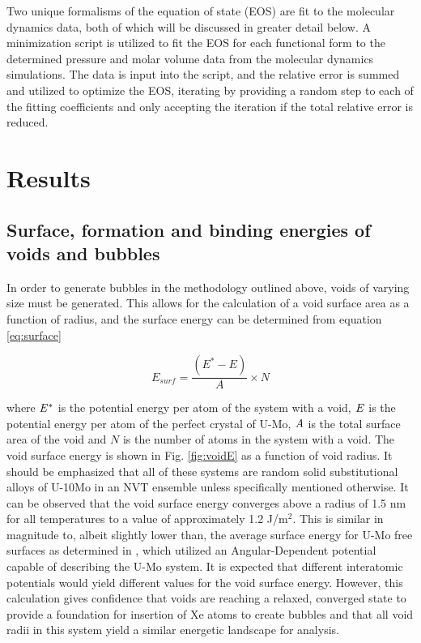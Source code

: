 \documentclass[review]{elsarticle}
\begin{document}
Two unique formalisms of the equation of state (EOS) are fit to the molecular dynamics data, both of which will be discussed in greater detail below. A minimization script is utilized to fit the EOS for each functional form to the determined pressure and molar volume data from the molecular dynamics simulations. The data is input into the script, and the relative error is summed and utilized to optimize the EOS, iterating by providing a random step to each of the fitting coefficients and only accepting the iteration if the total relative error is reduced. 

\section{Results}

\subsection{Surface, formation and binding energies of voids and bubbles}

In order to generate bubbles in the methodology outlined above, voids of varying size must be generated. This allows for the calculation of a void surface area as a function of radius, and the surface energy can be determined from equation \ref{eq:surface}

\begin{equation}
\label{eq:surface}
E_{surf}= \frac{(E^{*} - E)}{A} \times N
\end{equation}

where $\it{E^{*}}$ is the potential energy per atom of the system with a void, $\it{E}$ is the potential energy per atom of the perfect crystal of U-Mo, $\it{A}$ is the total surface area of the void and $\textit{N}$ is the number of atoms in the system with a void. The void surface energy is shown in Fig. \ref{fig:voidE} as a function of void radius. It should be emphasized that all of these systems are random solid substitutional alloys of U-10Mo in an NVT ensemble unless specifically mentioned otherwise. It can be observed that the void surface energy converges above a radius of 1.5 nm for all temperatures to a value of approximately 1.2 J/m$^2$. This is similar in magnitude to, albeit slightly lower than, the average surface energy for U-Mo free surfaces as determined in \cite{beelerumo}, which utilized an Angular-Dependent potential \cite{smirnovaADP} capable of describing the U-Mo system. It is expected that different interatomic potentials would yield different values for the void surface energy. However, this calculation gives confidence that voids are reaching a relaxed, converged state to provide a foundation for insertion of Xe atoms to create bubbles and that all void radii in this system yield a similar energetic landscape for analysis.
\end{document}
